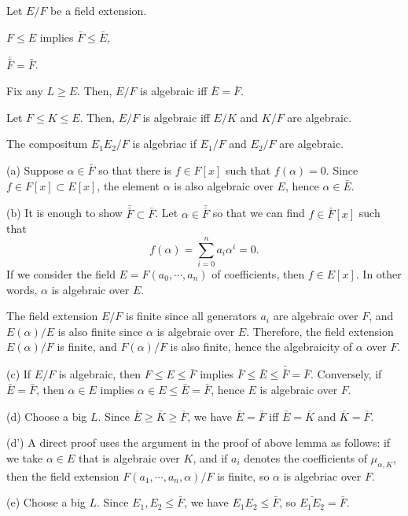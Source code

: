 \documentclass{../../large}
\begin{document}
\begin{prb}
Let $E/F$ be a field extension.
\begin{parts}
\item $F\le E$ implies $\bar F\le \bar E$,
\item $\bar{\bar F}=\bar F$.
\item Fix any $L\ge E$. Then, $E/F$ is algebraic iff $\bar E=\bar F$.
\item Let $F\le K\le E$. Then, $E/F$ is algebraic iff $E/K$ and $K/F$ are algebraic.
\item The compositum $E_1E_2/F$ is algebriac if $E_1/F$ and $E_2/F$ are algebraic.
\end{parts}
\end{prb}
\begin{pf}
(a)
Suppose $\alpha\in\bar F$ so that there is $f\in F[x]$ such that $f(\alpha)=0$.
Since $f\in F[x]\subset E[x]$, the element $\alpha$ is also algebraic over $E$, hence $\alpha\in\bar E$.

(b)
It is enough to show $\bar{\bar F}\subset\bar F$.
Let $\alpha\in\bar{\bar F}$ so that we can find $f\in\bar F[x]$ such that
\[f(\alpha)=\sum_{i=0}^na_i\alpha^i=0.\]
If we consider the field $E=F(a_0,\cdots,a_n)$ of coefficients, then $f\in E[x]$.
In other words, $\alpha$ is algebraic over $E$.

The field extension $E/F$ is finite since all generators $a_i$ are algebraic over $F$, and $E(\alpha)/E$ is also finite since $\alpha$ is algebraic over $E$.
Therefore, the field extension $E(\alpha)/F$ is finite, and $F(\alpha)/F$ is also finite, hence the algebraicity of $\alpha$ over $F$.

(c)
If $E/F$ is algebraic, then $F\le E\le\bar F$ implies $\bar F\le\bar E\le\bar{\bar F}=\bar F$.
Conversely, if $\bar E=\bar F$, then $\alpha\in E$ implies $\alpha\in E\le\bar E=\bar F$, hence $E$ is algebraic over $F$.

(d)
Choose a big $L$.
Since $\bar E\ge\bar K\ge\bar F$, we have $\bar E=\bar F$ iff $\bar E=\bar K$ and $\bar K=\bar F$.

(d')
A direct proof uses the argument in the proof of above lemma as follows: if we take $\alpha\in E$ that is algebraic over $K$, and if $a_i$ denotes the coefficients of $\mu_{\alpha,K}$, then the field extension $F(a_1,\cdots,a_n,\alpha)/F$ is finite, so $\alpha$ is algebriac over $F$.

(e)
Choose a big $L$.
Since $E_1,E_2\le\bar F$, we have $E_1E_2\le\bar F$, so $\bar{E_1E_2}=\bar{F}$.
\end{pf}
\end{document}
